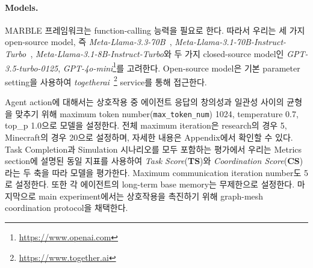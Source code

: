 \paragraph{Models.} MARBLE 프레임워크는 function-calling 능력을 필요로 한다. 따라서 우리는 세 가지 open-source model, 즉 \textit{Meta-Llama-3.3-70B~\citep{dubey2024llama}}, \textit{Meta-Llama-3.1-70B-Instruct-Turbo~\citep{dubey2024llama}}, \textit{Meta-Llama-3.1-8B-Instruct-Turbo}와 두 가지 closed-source model인 \textit{GPT-3.5-turbo-0125}, \textit{GPT-4o-mini}\footnote{\href{https://www.openai.com}{https://www.openai.com}}를 고려한다. Open-source model은 기본 parameter setting을 사용하여 \textit{togetherai}~\footnote{\href{https://www.together.ai}{https://www.together.ai}} service를 통해 접근한다.

Agent action에 대해서는 상호작용 중 에이전트 응답의 창의성과 일관성 사이의 균형을 맞추기 위해 maximum token number(\texttt{max\_token\_num}) 1024, temperature 0.7, top\_p 1.0으로 모델을 설정한다. 전체 maximum iteration은 research의 경우 5, Minecraft의 경우 20으로 설정하며, 자세한 내용은 Appendix에서 확인할 수 있다. Task Completion과 Simulation 시나리오를 모두 포함하는 평가에서 우리는 Metrics section에 설명된 동일 지표를 사용하여 \emph{Task Score}(\textbf{TS})와 \emph{Coordination Score}(\textbf{CS})라는 두 축을 따라 모델을 평가한다. Maximum communication iteration number도 5로 설정한다. 또한 각 에이전트의 long-term base memory는 무제한으로 설정한다. 마지막으로 main experiment에서는 상호작용을 촉진하기 위해 graph-mesh coordination protocol을 채택한다.





